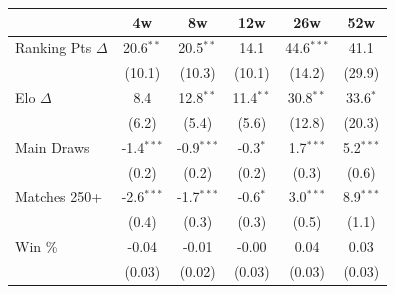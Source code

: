 \begin{tabular}{l*{5}{c}}
\toprule
 & 4w & 8w & 12w & 26w & 52w \\
\midrule
Ranking Pts $\Delta$ & 20.6$^{**}$ & 20.5$^{**}$ & 14.1 & 44.6$^{***}$ & 41.1 \\
 & (10.1) & (10.3) & (10.1) & (14.2) & (29.9) \\[0.3em]
Elo $\Delta$ & 8.4 & 12.8$^{**}$ & 11.4$^{**}$ & 30.8$^{**}$ & 33.6$^{*}$ \\
 & (6.2) & (5.4) & (5.6) & (12.8) & (20.3) \\[0.3em]
Main Draws & -1.4$^{***}$ & -0.9$^{***}$ & -0.3$^{*}$ & 1.7$^{***}$ & 5.2$^{***}$ \\
 & (0.2) & (0.2) & (0.2) & (0.3) & (0.6) \\[0.3em]
Matches 250+ & -2.6$^{***}$ & -1.7$^{***}$ & -0.6$^{*}$ & 3.0$^{***}$ & 8.9$^{***}$ \\
 & (0.4) & (0.3) & (0.3) & (0.5) & (1.1) \\[0.3em]
Win \% & -0.04 & -0.01 & -0.00 & 0.04 & 0.03 \\
 & (0.03) & (0.02) & (0.03) & (0.03) & (0.03) \\[0.3em]
\bottomrule
\end{tabular}
